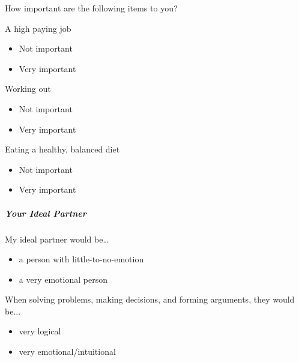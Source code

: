 \begin{multicols}{2}
 How important are the following items to you?

 A high paying job

 \begin{itemize}
  \item
        Not important
 \end{itemize}

 \begin{itemize}
  \item
        Very important
 \end{itemize}

 Working out

 \begin{itemize}
  \item
        Not important
 \end{itemize}

 \begin{itemize}
  \item
        Very important
 \end{itemize}

 Eating a healthy, balanced diet

 \begin{itemize}
  \item
        Not important
 \end{itemize}

 \begin{itemize}
  \item
        Very important
 \end{itemize}

 \subparagraph{Your Ideal Partner}

 My ideal partner would be\ldots{}

 \begin{itemize}
  \item
        a person with little-to-no-emotion
 \end{itemize}

 \begin{itemize}
  \item
        a very emotional person
 \end{itemize}

 When solving problems, making decisions, and forming arguments, they would be...

 \begin{itemize}
  \item
        very logical
 \end{itemize}

 \begin{itemize}
  \item
        very emotional/intuitional
 \end{itemize}


\end{multicols}
